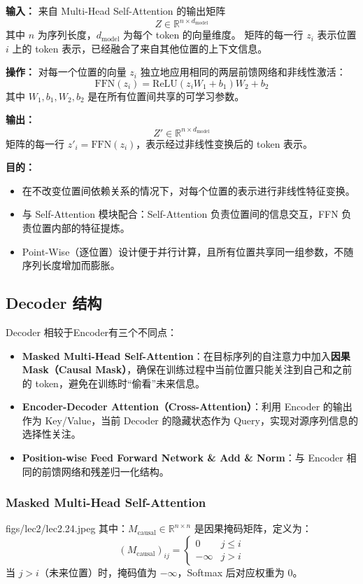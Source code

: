 \textbf{输入：} 来自 Multi-Head Self-Attention 的输出矩阵
\[
Z \in \mathbb{R}^{n \times d_{\text{model}}}
\]
其中 $n$ 为序列长度，$d_{\text{model}}$ 为每个 token 的向量维度。
矩阵的每一行 $z_i$ 表示位置 $i$ 上的 token 表示，已经融合了来自其他位置的上下文信息。

\textbf{操作：} 对每一个位置的向量 $z_i$ 独立地应用相同的两层前馈网络和非线性激活：
\[
\text{FFN}(z_i) = \text{ReLU}(z_i W_1 + b_1) W_2 + b_2
\]
其中 $W_1, b_1, W_2, b_2$ 是在所有位置间共享的可学习参数。

\textbf{输出：} 
\[
Z' \in \mathbb{R}^{n \times d_{\text{model}}}
\]
矩阵的每一行 $z'_i = \text{FFN}(z_i)$，表示经过非线性变换后的 token 表示。

\textbf{目的：}
\begin{itemize}
    \item 在不改变位置间依赖关系的情况下，对每个位置的表示进行非线性特征变换。
    \item 与 Self-Attention 模块配合：Self-Attention 负责位置间的信息交互，FFN 负责位置内部的特征提炼。
    \item Point-Wise（逐位置）设计便于并行计算，且所有位置共享同一组参数，不随序列长度增加而膨胀。
\end{itemize}


\clearpage
\subsection{Decoder 结构}

Decoder 相较于Encoder有三个不同点：
\begin{itemize}
  \item \textbf{Masked Multi-Head Self-Attention}：在目标序列的自注意力中加入\textbf{因果 Mask（Causal Mask）}，确保在训练过程中当前位置只能关注到自己和之前的 token，避免在训练时“偷看”未来信息。
  \item \textbf{Encoder-Decoder Attention（Cross-Attention）}：利用 Encoder 的输出作为 Key/Value，当前 Decoder 的隐藏状态作为 Query，实现对源序列信息的选择性关注。
  \item \textbf{Position-wise Feed Forward Network \& Add \& Norm}：与 Encoder 相同的前馈网络和残差归一化结构。
\end{itemize}


\subsubsection{Masked Multi-Head Self-Attention}


\MarginImageWithNote
  {figs/lec2/lec2.24.jpeg}
  {\label{fig:Masked Multi-Head Self-Attention}}
  {
  其中：$M_{\text{causal}} \in \mathbb{R}^{n \times n}$ 是因果掩码矩阵，定义为：
  \[
  (M_{\text{causal}})_{ij} =
  \begin{cases}
  0 & j \le i \\
  -\infty & j > i
  \end{cases}
  \]
  当 $j > i$（未来位置）时，掩码值为 $-\infty$，Softmax 后对应权重为 0。
  }

